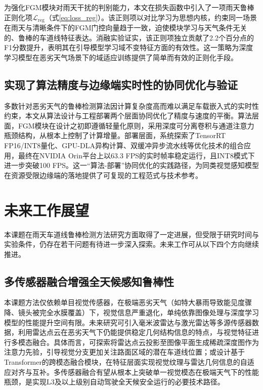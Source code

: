 为强化FGM模块对雨天干扰的判别能力，本文在损失函数中引入了一项雨天鲁棒正则化项\(\mathcal{L}_{\mathrm{reg}}\)（式\ref{eq:loss_reg}）。该正则项以对比学习为思想内核，约束同一场景在雨天与清晰条件下的FGM门控向量趋于一致，迫使模块学习与天气条件无关的、鲁棒的车道线特征表达。消融实验证实，该正则项独立贡献了2.2个百分点的F1分数提升，表明其在引导模型学习域不变特征方面的有效性。这一策略为深度学习模型在恶劣天气场景下的域适应训练提供了简单而有效的正则化手段。

\subsection{实现了算法精度与边缘端实时性的协同优化与验证}

多数针对恶劣天气的鲁棒检测算法因计算复杂度高而难以满足车载嵌入式的实时性约束，本文从算法设计与工程部署两个层面协同优化了精度与速度的平衡。算法层面，FGM模块在设计之初即遵循轻量化原则，采用深度可分离卷积与通道注意力瓶颈结构，从根本上控制了计算增量。部署层面，系统探索了TensorRT FP16/INT8量化、GPU-DLA异构计算、双缓冲异步流水线等优化技术的组合应用，最终在NVIDIA Orin平台上以63.3 FPS的实时帧率稳定运行，且INT8模式下进一步突破100 FPS。这一“算法-部署”协同优化的实践路径，为同类视觉感知模型在资源受限边缘端的落地提供了可复现的工程范式与技术参考。

\section{未来工作展望}
\label{sec:future_work}

本课题在雨天车道线鲁棒检测方法研究方面取得了一定进展，但受限于研究时间与实验条件，仍存在若干问题有待进一步深入探索。未来工作可从以下四个方向继续推进。

\subsection{多传感器融合增强全天候感知鲁棒性}

本课题方法仅依赖单目视觉传感器，在极端恶劣天气（如特大暴雨导致能见度骤降、镜头被完全水膜覆盖）下，视觉信息严重退化，单纯依靠图像处理与深度学习模型的性能提升空间有限。未来研究可引入毫米波雷达与激光雷达等多源传感器数据，利用雷达点云在恶劣天气下仍能提供稳定几何结构信息的特点，与视觉特征进行多模态融合。具体而言，可探索将雷达点云投影至图像平面生成稀疏深度图作为注意力先验，引导视觉分支更加关注路面区域的潜在车道线位置；或设计基于Transformer的跨模态融合模块，在特征层面实现视觉纹理与雷达几何信息的自适应对齐与互补。多传感器融合有望从根本上突破单一视觉模态在极端天气下的性能瓶颈，是实现L3及以上级别自动驾驶全天候安全运行的必要技术路径。

